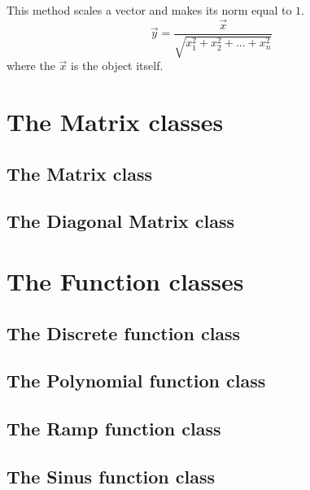 This method scales a vector and makes its norm equal to $1$.
\begin{equation*}
\overrightarrow{y} = \frac{\overrightarrow{x}}{\sqrt {x_{1}^2 + x_{2}^2 + ... + x_{n}^2}}
\end{equation*}
where the $\overrightarrow{x}$ is the object itself.


\section{The Matrix classes}

\subsection{The Matrix class}

\subsection{The Diagonal Matrix class}

\section{The Function classes}

\subsection{The Discrete function class}

\subsection{The Polynomial function class}

\subsection{The Ramp function class}

\subsection{The Sinus function class}
